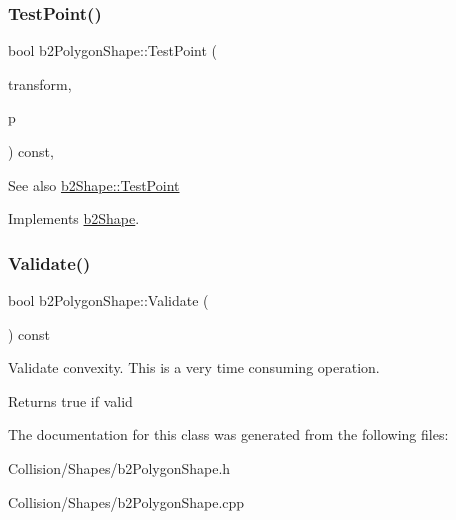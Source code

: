 \subsubsection{\texorpdfstring{Test\+Point()}{TestPoint()}}
{\footnotesize\ttfamily bool b2\+Polygon\+Shape\+::\+Test\+Point (\begin{DoxyParamCaption}\item[{const \mbox{\hyperlink{structb2Transform}{b2\+Transform}} \&}]{transform,  }\item[{const \mbox{\hyperlink{structb2Vec2}{b2\+Vec2}} \&}]{p }\end{DoxyParamCaption}) const\hspace{0.3cm}{\ttfamily [override]}, {\ttfamily [virtual]}}

\begin{DoxySeeAlso}{See also}
\mbox{\hyperlink{classb2Shape_a6ac968e403e2d93e8ae46d728a2e50fa}{b2\+Shape\+::\+Test\+Point}} 
\end{DoxySeeAlso}


Implements \mbox{\hyperlink{classb2Shape_a6ac968e403e2d93e8ae46d728a2e50fa}{b2\+Shape}}.

\mbox{\label{classb2PolygonShape_a135f4c20e17f10479e08f7befbd4d1f0}} 
\subsubsection{\texorpdfstring{Validate()}{Validate()}}
{\footnotesize\ttfamily bool b2\+Polygon\+Shape\+::\+Validate (\begin{DoxyParamCaption}{ }\end{DoxyParamCaption}) const}

Validate convexity. This is a very time consuming operation. \begin{DoxyReturn}{Returns}
true if valid 
\end{DoxyReturn}


The documentation for this class was generated from the following files\+:\begin{DoxyCompactItemize}
\item 
Collision/\+Shapes/b2\+Polygon\+Shape.\+h\item 
Collision/\+Shapes/b2\+Polygon\+Shape.\+cpp\end{DoxyCompactItemize}
